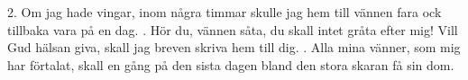 \setlength{\columnsep}{0.5cm}
\begin{multicols}{3}
2.  Om jag hade vingar,
    inom några timmar
    skulle jag
    hem till vännen fara
    ock tillbaka vara
    på en dag.
\vfill{}.  Hör du, vännen såta,
    du skall intet gråta
    efter mig!
    Vill Gud hälsan giva,
    skall jag breven skriva
    hem till dig.
\vfill{}.  Alla mina vänner,
    som mig har förtalat,
    skall en gång
    på den sista dagen
    bland den stora skaran
    få sin dom.
\end{multicols}
